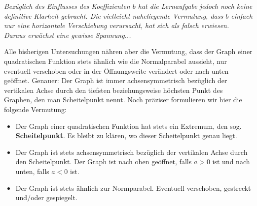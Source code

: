 \begin{center}
\end{center}
{\it
Bezüglich des Einflusses des Koeffizienten $b$ hat die Lernaufgabe jedoch noch keine definitive Klarheit gebracht. Die vielleicht naheliegende Vermutung, dass $b$ einfach nur eine horizontale Verschiebung verursacht, hat sich als falsch erwiesen. Daraus erwächst eine gewisse Spannung...
\medskip

Alle bisherigen Untersuchungen nähren aber die Vermutung, dass der Graph einer quadratischen Funktion stets \glqq ähnlich wie die Normalparabel \grqq{} aussieht, nur eventuell verschoben oder in der \glqq Öffnungsweite\grqq{} verändert oder nach unten geöffnet. Genauer: Der Graph ist immer achsensymmetrisch bezüglich der vertikalen Achse durch den tiefsten beziehungsweise höchsten Punkt des Graphen, den man Scheitelpunkt nennt. Noch präziser formulieren wir hier die folgende Vermutung:
}
\medskip

\begin{fazit}[Vermutungen]{}
    \begin{itemize}
        \item Der Graph einer quadratischen Funktion hat stets ein Extremum, den sog. \textbf{Scheitelpunkt}. Es bleibt zu klären, wo dieser Scheitelpunkt genau liegt.
        \item Der Graph ist stets achsensymmetrisch bezüglich der vertikalen Achse durch den Scheitelpunkt.
              Der Graph ist nach oben geöffnet, falls $a>0$ ist und nach unten, falls $a<0$ ist.
        \item Der Graph ist stets \glqq ähnlich\grqq{} zur Normparabel. Eventuell verschoben, gestreckt und/oder gespiegelt.
    \end{itemize}
\end{fazit}
\newpage

